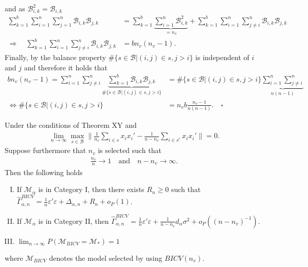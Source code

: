 \documentclass[Research_Module_ES.tex]{subfiles}
\begin{document}
and as $\mathcal{B}_{i,k}^2=\mathcal{B}_{i,k}$
\begin{align*}
\sum_{k=1}^b\sum_{i=1}^n\sum_{j=1}^n\mathcal{B}_{i,k}\mathcal{B}_{j,k} &= \sum_{k=1}^b\underbrace{\sum_{i=1}^n\mathcal{B}_{i,k}^2}_{=n_v} +\sum_{k=1}^b\sum_{i=1}^n\sum_{j\neq i}^n\mathcal{B}_{i,k}\mathcal{B}_{j,k}\\
\Rightarrow \quad \sum_{k=1}^b\sum_{i=1}^n\sum_{j\neq i}^n\mathcal{B}_{i,k}\mathcal{B}_{j,k} &= bn_v(n_v-1).
\end{align*}
Finally, by the balance property $\#\{s\in\mathcal{B}|(i,j)\in s, j>i\}$ is independent of $i$ and $j$ and therefore it holds that
\begin{align*}
bn_v(n_v-1) = \sum_{i=1}^n\sum_{j\neq i}^n\underbrace{\sum_{k=1}^b\mathcal{B}_{i,k}\mathcal{B}_{j,k}}_{\#\{s\in\mathcal{B}|(i,j)\in s, j>i\}}&=\#\{s\in\mathcal{B}|(i,j)\in s, j>i\}\underbrace{\sum_{i=1}^n\sum_{j\neq i}^n}_{n(n-1)}\\
\iff \#\{s\in\mathcal{B}|(i,j)\in s, j>i\}&=n_vb\frac{n_v-1}{n(n-1)}.\quad \square
\end{align*}


\begin{satz}
Under the conditions of Theorem XY and
\begin{align*}
\lim_{n\to\infty} \max_{s\in \mathcal{B}}\biggl\lVert \frac{1}{n_v}\sum_{i\in s}x_ix_i' - \frac{1}{n-n_v}\sum_{i\in s^c}x_ix_i'\biggr\rVert =0.
\end{align*}
Suppose furthermore that $n_v$ is selected such that
\begin{align*}
\frac{n_v}{n}\to 1 \quad \textrm{and} \quad n-n_v \to \infty.
\end{align*}
Then the following holds
\begin{enumerate}[(I)]
\item If $\mathcal{M}_\alpha$ is in Category I, then there exists $R_n \ge 0$ such that $\hat{\Gamma}_{\alpha,n}^{BICV} = \frac{1}{n}\varepsilon'\varepsilon + \Delta_{\alpha,n} + R_n + o_P(1)$.
\item If $\mathcal{M}_\alpha$ is in Category II, then $\hat{\Gamma}_{\alpha,n}^{BICV} = \frac{1}{n}\varepsilon'\varepsilon + \frac{1}{n-n_v}d_\alpha\sigma^2  + o_P((n-n_v)^{-1})$.
\item $\lim_{n\to\infty}P(\mathcal{M}_{BICV}=\mathcal{M}_\ast) = 1$
\end{enumerate}
where $\mathcal{M}_{BICV}$ denotes the model selected by using $BICV(n_v)$.
\end{satz}
\end{document}

